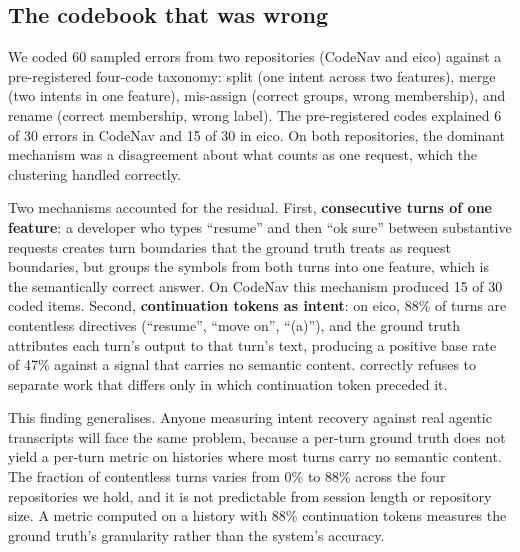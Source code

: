 \subsection{The codebook that was wrong}
\label{sec:codebook-wrong}

We coded 60 sampled errors from two repositories (CodeNav and eico) against
a pre-registered four-code taxonomy: split (one intent across two features),
merge (two intents in one feature), mis-assign (correct groups, wrong
membership), and rename (correct membership, wrong label). The pre-registered
codes explained 6 of 30 errors in CodeNav and 15 of 30 in eico. On both
repositories, the dominant mechanism was a disagreement about what counts
as one request, which the clustering handled correctly.

Two mechanisms accounted for the residual. First, \textbf{consecutive turns of
one feature}: a developer who types ``resume'' and then ``ok sure'' between
substantive requests creates turn boundaries that the ground truth treats as
request boundaries, but \sgt{} groups the symbols from both turns into one
feature, which is the semantically correct answer. On CodeNav this mechanism
produced 15 of 30 coded items. Second, \textbf{continuation tokens as intent}:
on eico, 88\% of turns are contentless directives (``resume'', ``move on'',
``(a)''), and the ground truth attributes each turn's output to that turn's
text, producing a positive base rate of 47\% against a signal that carries no
semantic content. \sgt{} correctly refuses to separate work that differs only in
which continuation token preceded it.

This finding generalises. Anyone measuring intent recovery against real agentic
transcripts will face the same problem, because a per-turn ground truth does not
yield a per-turn metric on histories where most turns carry no semantic content. The fraction of contentless turns varies from 0\% to 88\%
across the four repositories we hold, and it is not predictable from session
length or repository size. A metric computed on a history with 88\%
continuation tokens measures the ground truth's granularity rather than the
system's accuracy.

